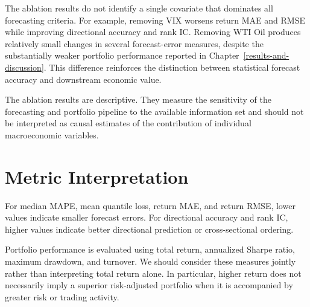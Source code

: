 \documentclass[12pt,a4paper,twoside,openany]{book}
\begin{document}
\begin{table}[htbp]
\centering
\caption{Forecast results from the leave-one-covariate-out experiments.}
\label{tab:appendix-forecast-ablation}
\small
{}
\end{table}

The ablation results do not identify a single covariate that dominates
all forecasting criteria. For example, removing VIX worsens return MAE
and RMSE while improving directional accuracy and rank IC. Removing WTI
Oil produces relatively small changes in several forecast-error measures,
despite the substantially weaker portfolio performance reported in
Chapter~\ref{results-and-discussion}. This difference reinforces the
distinction between statistical forecast accuracy and downstream
economic value.

The ablation results are descriptive. They measure the sensitivity of
the forecasting and portfolio pipeline to the available information set
and should not be interpreted as causal estimates of the contribution of
individual macroeconomic variables.

\section{Metric Interpretation}
\label{appendix-metric-interpretation}

For median MAPE, mean quantile loss, return MAE, and return RMSE, lower
values indicate smaller forecast errors. For directional accuracy and
rank IC, higher values indicate better directional prediction or
cross-sectional ordering.

Portfolio performance is evaluated using total return, annualized
Sharpe ratio, maximum drawdown, and turnover. We should consider these
measures jointly rather than interpreting total return alone. In
particular, higher return does not necessarily imply a superior
risk-adjusted portfolio when it is accompanied by greater risk or
trading activity.
\end{document}

